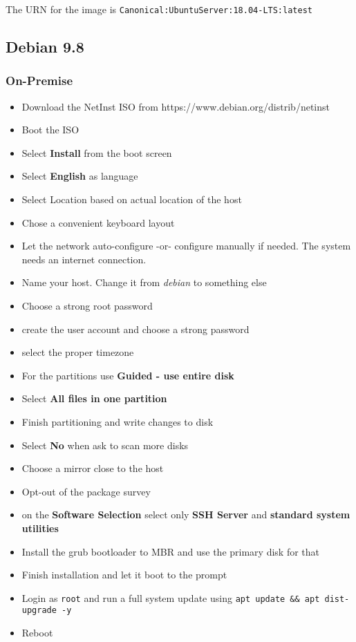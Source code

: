 The URN for the image is \texttt{Canonical:UbuntuServer:18.04-LTS:latest}

\subsection{Debian 9.8}

\subsubsection{On-Premise}

\begin{itemize}
    \item Download the NetInst ISO from https://www.debian.org/distrib/netinst
    \item Boot the ISO
    \item Select \textbf{Install} from the boot screen
    \item Select \textbf{English} as language
    \item Select Location based on actual location of the host
    \item Chose a convenient keyboard layout
    \item Let the network auto-configure -or- configure manually if needed. The system needs an internet connection.
    \item Name your host. Change it from \textit{debian} to something else
    \item Choose a strong root password
    \item create the user account and choose a strong password
    \item select the proper timezone
    \item For the partitions use \textbf{Guided - use entire disk}
    \item Select \textbf{All files in one partition}
    \item Finish partitioning and write changes to disk
    \item Select \textbf{No} when ask to scan more disks
    \item Choose a mirror close to the host
    \item Opt-out of the package survey
    \item on the \textbf{Software Selection} select only \textbf{SSH Server} and \textbf{standard system utilities}
    \item Install the grub bootloader to MBR and use the primary disk for that
    \item Finish installation and let it boot to the prompt
    \item Login as \texttt{root} and run a full system update using \texttt{apt update \&\& apt dist-upgrade -y}
    \item Reboot
\end{itemize}


